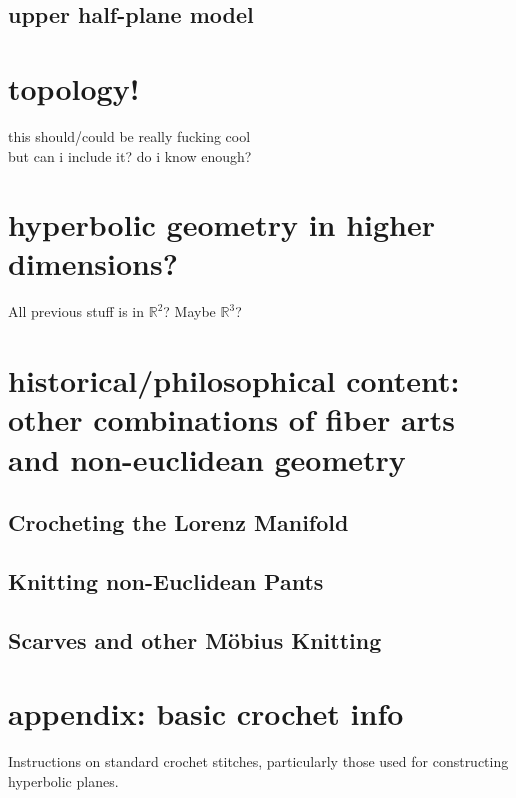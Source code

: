 \documentclass{article}
\begin{document}
\subsection{upper half-plane model}

\section{topology!}
this should/could be really fucking cool\\
but can i include it? do i know enough?

\section{hyperbolic geometry in higher dimensions?}
All previous stuff is in $\mathbb{R}^2$? Maybe $\mathbb{R}^3$?

\section{historical/philosophical content: other combinations of fiber arts and non-euclidean geometry}
\subsection{Crocheting the Lorenz Manifold \cite{crochetlorenz}}
\subsection{Knitting non-Euclidean Pants \cite{makingmath}}
\subsection{Scarves and other M\"obius Knitting \cite{magicalknitting}\cite{magicalknitting2}}

\section{appendix: basic crochet info}
Instructions on standard crochet stitches, particularly those used for constructing hyperbolic planes. \cite{happyhooker}

\newpage


\end{document}
